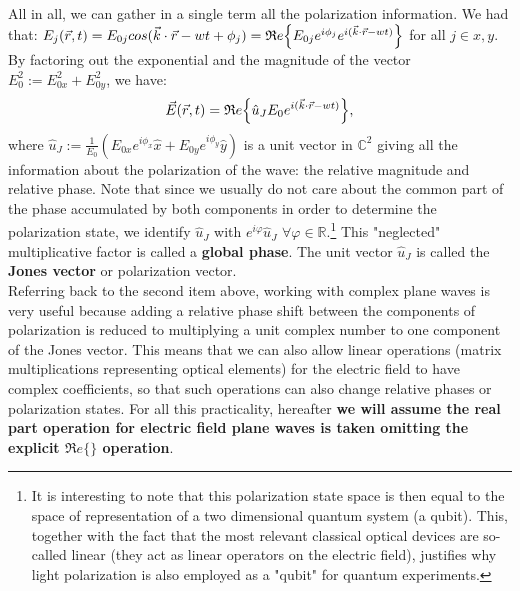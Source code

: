 \documentclass[11pt, a4paper, twoside]{article} %
\newcommand{\R}{\mathbb{R}} %
\newcommand{\C}{\mathbb{C}}
\begin{document}
{All in all, we can gather in a single term all the polarization information. We had that: $E_j(\vec{r},t)=E_{0j}cos(\vec{k}\cdot\vec{r}-wt+\phi_j)=\mathfrak{R}e\qty{E_{0j}e^{i\phi_j}e^{i(\vec{k}\cdot\vec{r}-wt)}}$ for all $j\in{x,y}$. By factoring out the exponential and the magnitude of the vector $E_0^2:=E_{0x}^2+E_{0y}^2$, we have:\vspace{-0.1cm}
\begin{equation}
\vec{E}(\vec{r},t)=\mathfrak{R}e\qty{\hat{u}_JE_0e^{i(\vec{k}\cdot\vec{r}-wt)} },\vspace{-0.1cm}
\end{equation}
where $\hat{u}_J:=\frac{1}{E_0}(E_{0x}e^{i\phi_x}\hat{x}+E_{0y}e^{i\phi_y}\hat{y})$ is a unit vector in $\C^2$ giving all the information about the polarization of the wave: the relative magnitude and relative phase. Note that since we usually do not care about the common part of the phase accumulated by both components in order to determine the polarization state, we identify $\hat{u}_J$ with $e^{i\varphi}\hat{u}_J$ $\forall 	\varphi\in\R$.\footnote{It is interesting to note that this polarization state space is then equal to the space of representation of a two dimensional quantum system (a qubit). This, together with the fact that the most relevant classical optical devices are so-called linear (they act as linear operators on the electric field), justifies why light polarization is also employed as a "qubit" for quantum experiments.} This "neglected" multiplicative factor is called a {\bf global phase}. The unit vector $\hat{u}_J$ is called the {\bf Jones vector} or polarization vector.\vspace{-0.1cm}\\

Referring back to the second item above, working with complex plane waves is very useful because adding a relative phase shift between the components of polarization is reduced to multiplying a unit complex number to one component of the Jones vector. This means that we can also allow linear operations (matrix multiplications representing optical elements) for the electric field to have complex coefficients, so that such operations can also change relative phases or polarization states. For all this practicality, hereafter  {\bf we will assume the real part operation for electric field plane waves is taken omitting the explicit $\mathfrak{R}e\{\}$ operation}.
}\vspace{-0.5cm}
\end{document}
